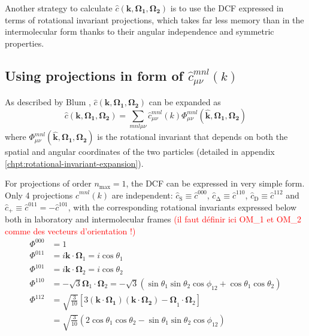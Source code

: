 Another strategy to calculate $\hat{c}(\mathbf{k},\mathbf{\Omega_{1}},\mathbf{\Omega_{2}})$
is to use the DCF expressed in terms of rotational invariant projections,
which takes far less memory than in the intermolecular form thanks
to their angular independence and symmetric properties. 

\subsection{Using projections in form of $\hat{c}_{\mu\nu}^{mnl}(k)$\label{subsec:Using-projections-in}}

As described by Blum \citep{Blum_I,Blum_II}, $\hat{c}(\mathbf{k},\mathbf{\Omega_{1}},\mathbf{\Omega_{2}})$
can be expanded as
\begin{equation}
\hat{c}(\mathbf{k},\mathbf{\Omega_{1}},\mathbf{\Omega_{2}})=\sum_{mnl\mu\nu}\hat{c}_{\mu\nu}^{mnl}(k)\Phi_{\mu\nu}^{mnl}(\mathbf{\hat{k}},\mathbf{\Omega_{1}},\mathbf{\Omega_{2}})
\end{equation}
where $\Phi_{\mu\nu}^{mnl}(\mathbf{\hat{k}},\mathbf{\Omega_{1}},\mathbf{\Omega_{2}})$
is the rotational invariant that depends on both the spatial and angular
coordinates of the two particles (detailed in appendix \ref{chpt:rotational-invariant-expansion}).

For projections of order $n_{\mathrm{max}}=1$, the DCF can be expressed
in very simple form. Only 4 projections $\hat{c}^{mnl}(k)$ are independent:
$\hat{c}_{\mathrm{S}}\equiv\hat{c}^{000}$, $\hat{c}_{\mathrm{\Delta}}\equiv\hat{c}^{110}$,
$\hat{c}_{\mathrm{D}}\equiv\hat{c}^{112}$ and $\hat{c}_{+}\equiv\hat{c}^{011}=-\hat{c}^{101}$,
with the corresponding rotational invariants expressed below both
in laboratory and intermolecular frames \textcolor{red}{(il faut définir
ici OM\_1 et OM\_2 comme des vecteurs d'orientation !)}
\begin{align}
\Phi^{000} & =1\nonumber \\
\Phi^{011} & =i\mathbf{k}\cdot\mathbf{\Omega}_{1}=i\cos\theta_{1}\nonumber \\
\Phi^{101} & =i\mathbf{k}\cdot\mathbf{\Omega}_{2}=i\cos\theta_{2}\nonumber \\
\Phi^{110} & =-\sqrt{3}\mathbf{\Omega}_{1}\cdot\mathbf{\Omega}_{2}=-\sqrt{3}(\sin\theta_{1}\sin\theta_{2}\cos\phi_{12}+\cos\theta_{1}\cos\theta_{2})\nonumber \\
\Phi^{112} & =\sqrt{\frac{3}{10}}\left[3\mathbf{(\mathbf{k}\cdot\mathbf{\Omega}_{1})(\mathbf{k}\cdot\mathbf{\Omega}_{2})-\Omega}_{1}\cdot\mathbf{\Omega}_{2}\right]\\
 & =\sqrt{\frac{3}{10}}\left(2\cos\theta_{1}\cos\theta_{2}-\sin\theta_{1}\sin\theta_{2}\cos\phi_{12}\right)\nonumber 
\end{align}

